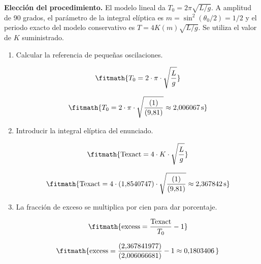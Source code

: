 \noindent\textbf{Elección del procedimiento.} El modelo lineal da $T_0=2\pi\sqrt{L/g}$. A amplitud de 90 grados, el parámetro de la integral elíptica es $m=\sin^2(\theta_0/2)=1/2$ y el periodo exacto del modelo conservativo es $T=4K(m)\sqrt{L/g}$. Se utiliza el valor de $K$ suministrado.

\begin{enumerate}

\item Calcular la referencia de pequeñas oscilaciones.

\[\fitmath{T_{0}=2\cdot \pi\cdot \sqrt{\frac{L}{g}}}\]

\[\fitmath{T_{0}=2\cdot \pi\cdot \sqrt{\frac{(1)}{(9{,}81)}}\approx 2{,}006067\,\mathrm{s}}\]

\item Introducir la integral elíptica del enunciado.

\[\fitmath{\mathrm{Texact}=4\cdot K\cdot \sqrt{\frac{L}{g}}}\]

\[\fitmath{\mathrm{Texact}=4\cdot (1{,}8540747)\cdot \sqrt{\frac{(1)}{(9{,}81)}}\approx 2{,}367842\,\mathrm{s}}\]

\item La fracción de exceso se multiplica por cien para dar porcentaje.

\[\fitmath{\mathrm{excess}=\frac{\mathrm{Texact}}{T_{0}}-1}\]

\[\fitmath{\mathrm{excess}=\frac{(2{,}367841977)}{(2{,}006066681)}-1\approx 0{,}1803406\,}\]

\end{enumerate}
